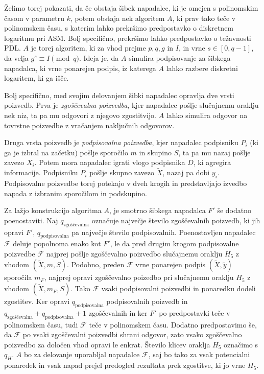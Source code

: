 \documentclass[isrm2, tisk]{fmfdelo}
\begin{document}
Želimo torej pokazati, da če obstaja šibek napadalec, ki je omejen s polinomskim časom v parametru
$k$, potem obstaja nek algoritem $A$, ki prav tako teče v polinomskem času, s katerim lahko prekršimo
predpostavko o diskretnem logaritmu pri ASM. Bolj specifično, prekršimo lahko predpostavko o
težavnosti PDL. $A$ je torej algoritem, ki za vhod prejme $p, q, g$ in $I$, in vrne $s \in [0, q - 1]$,
da velja $g^s \equiv I \pmod q$. Ideja je, da $A$ simulira podpisovanje za šibkega napadalca,
ki vrne ponarejen podpis, iz katerega $A$ lahko razbere diskretni logaritem, ki ga išče.

Bolj specifično, med svojim delovanjem šibki napadalec opravlja dve vrsti poizvedb. Prva je
\textit{zgoščevalna poizvedba}, kjer napadalec pošlje slučajnemu oraklju nek niz, ta pa mu odgovori
z njegovo zgostitvijo. $A$ lahko simulira odgovor na tovrstne poizvedbe z vračanjem naključnih odgovorov.

Druga vrsta poizvedb je \textit{podpisovalna poizvedba}, kjer napadalec podpisniku $P_i$ (ki ga je 
izbral na začetku) pošlje sporočilo $m$ in skupino $S$, ta pa mu nazaj pošlje zavezo $X_i$. Potem
mora napadalec igrati vlogo podpisnika $D$, ki agregira informacije. Podpisniku $P_i$ pošlje skupno
zavezo $\tilde{X}$, nazaj pa dobi $y_i$. Podpisovalne poizvedbe torej potekajo v dveh krogih in
predstavljajo izvedbo napada z izbranim sporočilom in podskupino.

Za lažjo konstrukcijo algoritma $A$, je smotrno šibkega napadalca $F'$ še dodatno poenostaviti. Naj
$q_{\text{zgoščevalna}}$ označuje največje število zgoščevalnih poizvedb, ki jih opravi $F'$,
$q_{\text{podpisovalna}}$ pa največje število podpisovalnih. Poenostavljen napadalec $\mathcal{F}$
deluje popolnoma enako kot $F'$, le da pred drugim krogom podpisovalne poizvedbe $\mathcal{F}$
najprej pošlje zgoščevalno poizvedbo slučajnemu oraklju $H_5$ z vhodom $(\tilde{X}, m, S)$. Podobno,
preden $\mathcal{F}$ vrne ponarejen podpis $(\tilde{X}, \tilde{y})$ sporočila $m_F$, najprej opravi
zgoščevalno poizedbo pri slučajnemu oraklju $H_5$ z vhodom $(\tilde{X}, m_F, S)$. Tako $\mathcal{F}$
vsaki podpisovalni poizvedbi in ponaredku dodeli zgostitev. Ker opravi $q_{\text{podpisovalna}}$
podpisovalnih poizvedb in $q_{\text{zgoščevalna}} + q_{\text{podpisovalna}} + 1$ zgoščevalnih in
ker $F'$ po predpostavki teče v polinomskem času, tudi $\mathcal{F}$ teče v polinomskem času.
Dodatno predpostavimo še, da $\mathcal{F}$ po vsaki zgoščevalni poizvedbi shrani odgovor, zato vsako
zgoščevalno poizvedbo za določen vhod opravi le enkrat. Število klicev oraklja $H_5$ označimo s $q_H$.
$A$ bo za delovanje uporabljal napadalce $\mathcal{F}$, saj bo tako za vsak potencialni ponaredek in
vsak napad prejel predogled rezultata prek zgostitve, ki jo vrne $H_5$.
\end{document}
